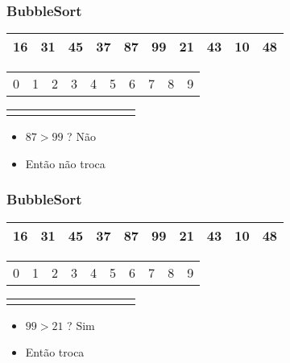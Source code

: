 \documentclass{beamer}
\begin{document}
\begin{frame}
    \frametitle{BubbleSort}
    \begin{center}
        \begin{table}
            \begin{tabular}{| p{0.25cm} | p{0.25cm} | p{0.25cm} | p{0.25cm} | p{0.25cm} | p{0.25cm} | p{0.25cm} | p{0.25cm} | p{0.25cm} | p{0.25cm} |}
                \hline
                16 & 31 & 45 & 37 & 87 & 99 & 21 & 43 & 10 & 48 \\ \hline
            \end{tabular}
            \begin{tabular}{p{0.25cm} p{0.25cm} p{0.25cm} p{0.25cm} p{0.25cm} p{0.25cm} p{0.25cm} p{0.25cm} p{0.25cm} p{0.25cm}}
                0 & 1 & 2 & 3 & 4 & 5 & 6 & 7 & 8 & 9
            \end{tabular}
            \begin{tabular}{p{0.25cm} p{0.25cm} p{0.25cm} p{0.25cm} p{0.25cm} p{0.25cm} p{0.25cm} p{0.25cm} p{0.25cm} p{0.25cm}}
                & & & & \color{red}{$\uparrow$} & \color{blue}{$\uparrow$} & & & &
            \end{tabular}
        \end{table}
	\end{center}
    \begin{itemize}[<+->]
        \item $87 > 99$ ? Não
        \item Então não troca
    \end{itemize}
\end{frame}

\begin{frame}
    \frametitle{BubbleSort}
    \begin{center}
        \begin{table}
            \begin{tabular}{| p{0.25cm} | p{0.25cm} | p{0.25cm} | p{0.25cm} | p{0.25cm} | p{0.25cm} | p{0.25cm} | p{0.25cm} | p{0.25cm} | p{0.25cm} |}
                \hline
                16 & 31 & 45 & 37 & 87 & 99 & 21 & 43 & 10 & 48 \\ \hline
            \end{tabular}
            \begin{tabular}{p{0.25cm} p{0.25cm} p{0.25cm} p{0.25cm} p{0.25cm} p{0.25cm} p{0.25cm} p{0.25cm} p{0.25cm} p{0.25cm}}
                0 & 1 & 2 & 3 & 4 & 5 & 6 & 7 & 8 & 9
            \end{tabular}
            \begin{tabular}{p{0.25cm} p{0.25cm} p{0.25cm} p{0.25cm} p{0.25cm} p{0.25cm} p{0.25cm} p{0.25cm} p{0.25cm} p{0.25cm}}
                & & & & & \color{blue}{$\uparrow$} & \color{red}{$\uparrow$} & & &
            \end{tabular}
        \end{table}
	\end{center}
    \begin{itemize}[<+->]
        \item $99 > 21$ ? Sim
        \item Então troca
    \end{itemize}
\end{frame}
\end{document}
